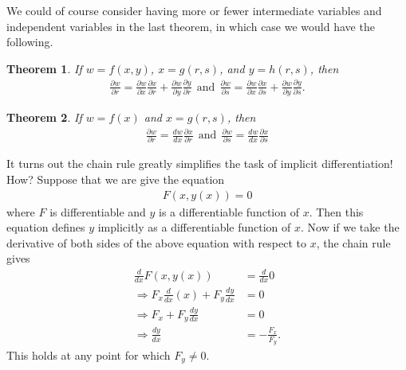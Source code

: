 \documentclass[12pt, letter]{article}
\theoremstyle{plain}
\newtheorem{theorem}{Theorem}
\numberwithin{theorem}{section}
\theoremstyle{definition}
\begin{document}
\bigskip

\hrulefill

\bigskip

We could of course consider having more or fewer intermediate variables and independent variables in the last theorem, in which case we would have the following.

\bigskip

\begin{theorem}
If $w=f(x,y)$, $x=g(r,s)$, and $y=h(r,s)$, then
\begin{align*}
\frac{\partial w}{\partial r} = \frac{\partial w}{\partial x}\frac{\partial x}{\partial r} + \frac{\partial w}{\partial y}\frac{\partial y}{\partial r} \ \ \text{and} \ \ \frac{\partial w}{\partial s} = \frac{\partial w}{\partial x}\frac{\partial x}{\partial s} + \frac{\partial w}{\partial y}\frac{\partial y}{\partial s}.
\end{align*}
\end{theorem}

\bigskip

\begin{theorem}
If $w=f(x)$ and $x=g(r,s)$, then
\begin{align*}
\frac{\partial w}{\partial r} = \frac{dw}{dx} \frac{\partial x}{\partial r} \ \ \text{and} \ \ \frac{\partial w}{\partial s} = \frac{dw}{dx} \frac{\partial x}{\partial s}
\end{align*}
\end{theorem}

\bigskip

\hrulefill

\bigskip

It turns out the chain rule greatly simplifies the task of implicit differentiation! How? Suppose that we are give the equation
\begin{align*}
F(x,y(x)) = 0
\end{align*}
where $F$ is differentiable and $y$ is a differentiable function of $x$. Then this equation defines $y$ implicitly as a differentiable function of $x$. Now if we take the derivative of both sides of the above equation with respect to $x$, the chain rule gives
\begin{align*}
\frac{d}{dx} F(x,y(x)) &= \frac{d}{dx} 0\\
\Rightarrow F_x \frac{d}{dx}(x) + F_y \frac{dy}{dx} &= 0\\
\Rightarrow F_x + F_y \frac{dy}{dx} &= 0\\
\Rightarrow \frac{dy}{dx} &= -\frac{F_x}{F_y}.
\end{align*} 
This holds at any point for which $F_y \neq 0$.
\end{document}
